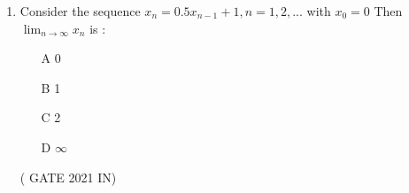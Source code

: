 \begin{enumerate}[label=\thechapter.\arabic*,ref=\thechapter.\theenumi]
\item Consider the sequence $ x_n = 0.5x_{n-1} + 1 , n = 1,2,...$ with $x_0 = 0$ Then $ \lim_{n \to \infty} x_n$ is :
\begin{enumerate}
\item[A]0
\item[B]1
\item[C]2
\item[D]$\infty$
\end{enumerate}
\hfill( GATE 2021 IN)
\solution

\pagebreak
\end{enumerate}
